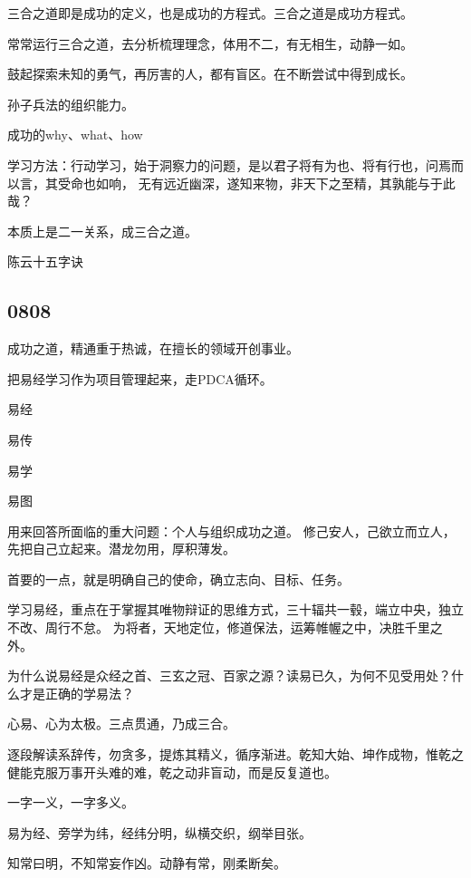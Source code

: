 三合之道即是成功的定义，也是成功的方程式。三合之道是成功方程式。

常常运行三合之道，去分析梳理理念，体用不二，有无相生，动静一如。

鼓起探索未知的勇气，再厉害的人，都有盲区。在不断尝试中得到成长。

孙子兵法的组织能力。

成功的why、what、how

学习方法：行动学习，始于洞察力的问题，是以君子将有为也、将有行也，问焉而以言，其受命也如响，
无有远近幽深，遂知来物，非天下之至精，其孰能与于此哉？

本质上是二一关系，成三合之道。

陈云十五字诀

\subsection{0808}

成功之道，精通重于热诚，在擅长的领域开创事业。

把易经学习作为项目管理起来，走PDCA循环。

\begin{enumbox}
\item 易经
\item 易传
\item 易学
\item 易图
\end{enumbox}

用来回答所面临的重大问题：个人与组织成功之道。
修己安人，己欲立而立人，先把自己立起来。潜龙勿用，厚积薄发。

首要的一点，就是明确自己的使命，确立志向、目标、任务。

学习易经，重点在于掌握其唯物辩证的思维方式，三十辐共一毂，端立中央，独立不改、周行不怠。
为将者，天地定位，修道保法，运筹帷幄之中，决胜千里之外。

为什么说易经是众经之首、三玄之冠、百家之源？读易已久，为何不见受用处？什么才是正确的学易法？

心易、心为太极。三点贯通，乃成三合。

逐段解读系辞传，勿贪多，提炼其精义，循序渐进。乾知大始、坤作成物，惟乾之健能克服万事开头难的难，乾之动非盲动，而是反复道也。

一字一义，一字多义。

易为经、旁学为纬，经纬分明，纵横交织，纲举目张。

知常曰明，不知常妄作凶。动静有常，刚柔断矣。
